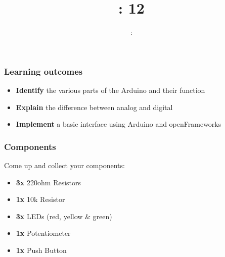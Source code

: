 \usepackage{../../beamerthemeFalmouthGamesAcademy}
\usepackage{multimedia}
\graphicspath{ {../../} }


\usepackage[normalem]{ulem}
\usepackage{wasysym}
\usepackage{listings}
\usepackage{pdfpages}

\usetikzlibrary{arrows,automata}




\title{\sessionnumber: 12}
\subtitle{\modulecode: \moduletitle}

\frame{\titlepage}

\begin{frame}
	\frametitle{Learning outcomes}
	\begin{itemize}
		\item \textbf{Identify} the various parts of the Arduino and their function
		\item \textbf{Explain} the difference between analog and digital
		\item \textbf{Implement} a basic interface using Arduino and openFrameworks
	\end{itemize}
\end{frame}

\begin{frame}
	\frametitle{Components}
	Come up and collect your components:
	\begin{itemize}
		\item \textbf{3x} 220ohm Resistors
		\item \textbf{1x} 10k Resistor
		\item \textbf{3x} LEDs (red, yellow \& green)
		\item \textbf{1x} Potentiometer
		\item \textbf{1x} Push Button
	\end{itemize}
\end{frame}

